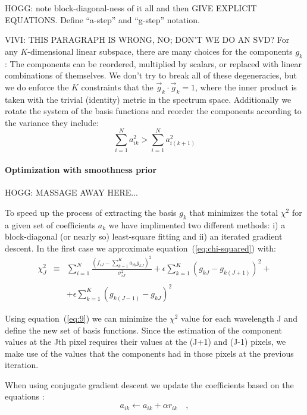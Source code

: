 \documentclass[12pt,preprint]{aastex}
\newcommand{\equationname}{equation}
\begin{document}
HOGG: note block-diagonal-ness of it all and then GIVE EXPLICIT
EQUATIONS.  Define ``a-step'' and ``g-step'' notation.

VIVI: THIS PARAGRAPH IS WRONG, NO; DON'T WE DO AN SVD?
For any $K$-dimensional linear subspace, there are many choices for
the components $g_k$: The components can be reordered, multiplied by
scalars, or replaced with linear combinations of themselves.  We don't
try to break all of these degeneracies, but we do enforce the
$K$ constraints that the $\vec{g}_k\cdot\vec{g}_k=1$, where the inner
product is taken with the trivial (identity) metric in the spectrum
space. Additionally we rotate the system of the basis functions and
reorder the components according to the variance they include:
\begin{equation}\label{eq:ordering}
\sum_{i=1}^{N}a_{ik}^2>\sum_{i=1}^{N}a_{i(k+1)}^2
\end{equation}

\paragraph{Optimization with smoothness prior}

HOGG: MASSAGE AWAY HERE...

To speed up the process of extracting the basis $g_{k}$ that minimizes
the total $\chi^2$ for a given set of coefficients $a_{k}$ we have
implimented two different methods: i) a block-diagonal (or nearly so)
least-square fitting and ii) an iterated gradient descent. In the
first case we approximate \equationname~(\ref{eq:chi-squared}) with:
\begin{equation}\label{eq:9}
\begin{array}{rcl}
\chi^2_{J} & \equiv & \sum_{i=1}^{N}\frac{(f_{iJ}-\sum_{k=1}^{K}a_{ik}g_{kJ})^2}{\sigma^2_{iJ}}+\epsilon\sum_{k=1}^{K}(g_{kJ}-g_{k(J+1)})^2+ \\
&&\\
 & & +\epsilon\sum_{k=1}^{K}(g_{k(J-1)}-g_{kJ})^2
\quad 
\end{array}
\end{equation}

Using \equationname~(\ref{eq:9}) we can minimize the $\chi^2$ value
for each wavelength J and define the new set of basis functions. Since
the estimation of the component values at the Jth pixel requires their
values at the (J+1) and (J-1) pixels, we make use of the values that
the components had in those pixels at the previous iteration.

When using conjugate gradient descent we update the coefficients based
on the equations \citep[for example, ][]{shewchuk}:
\begin{equation}\label{eq:10}
a_{ik} \gets a_{ik}+\alpha r_{ik}
\quad ,
\end{equation}
\end{document}
